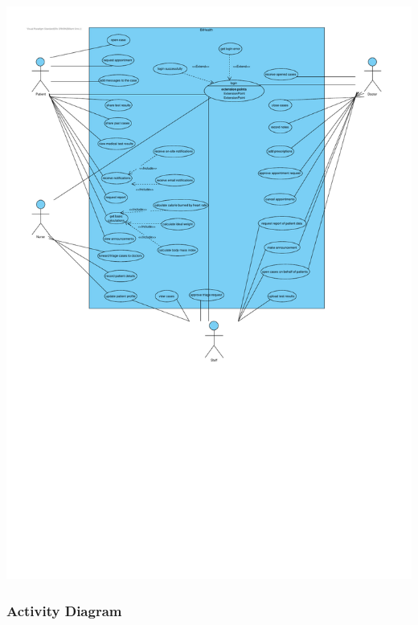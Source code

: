 \documentclass[a4paper, 12pt, titlepage]{article}
\begin{document}
  \includegraphics[width=\linewidth]{use_case_diag}

  \subsubsection{Activity Diagram}
\end{document}
